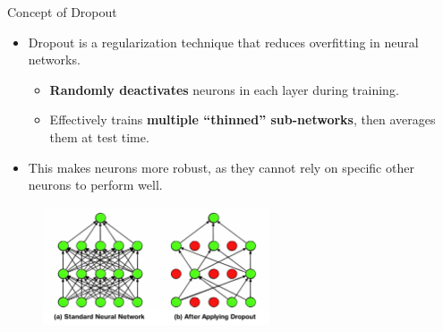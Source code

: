 \documentclass[serif, aspectratio=169]{beamer}
\begin{document}
\begin{frame}{Concept of Dropout}
    \begin{itemize}
        \item Dropout is a regularization technique that reduces overfitting in neural networks.
        \begin{itemize}
            \item \textbf{Randomly deactivates} neurons in each layer during training.
            \item Effectively trains \textbf{multiple “thinned” sub-networks}, then averages them at test time.
        \end{itemize}
        \item This makes neurons more robust, as they cannot rely on specific other neurons to perform well.
    \end{itemize}
    \begin{figure}
            \includegraphics[width=0.6\textwidth]{pic/Dropout.png}
            \label{fig:Dropout}
        \end{figure}
\end{frame}
\end{document}
